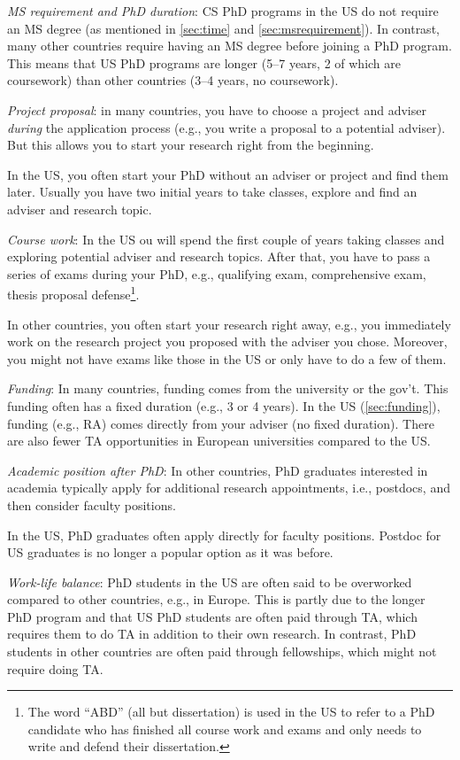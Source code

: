 \documentclass[oneside,11pt,dvipsnames]{book}
\begin{document}
\emph{MS requirement and PhD duration}:  CS PhD programs in the US do not require an MS degree (as mentioned in \autoref{sec:time} and \autoref{sec:msrequirement}).  In contrast, many other countries require having an MS degree before joining a PhD program.  This means that US PhD programs are longer (5--7 years, 2 of which are coursework) than other countries (3--4 years, no coursework).

\emph{Project proposal}: in many countries, you have to choose a project and adviser \emph{during} the application process (e.g., you write a proposal to a potential adviser). But this allows you to start your research right from the beginning. 

In the US, you often start your PhD without an adviser or project and find them later. Usually you have two initial years to take classes, explore and find an adviser and research topic. 

\emph{Course work}: In the US ou will spend the first couple of years taking classes and exploring potential adviser and research topics. 
After that, you have to pass a series of exams during your PhD, e.g., qualifying exam, comprehensive exam, thesis proposal defense\footnote{The word ``ABD'' (all but dissertation) is used in the US to refer to a PhD candidate who has finished all course work and exams and only needs to write and defend their dissertation.}.

In other countries, you often start your research right away, e.g., you immediately work on the research project you proposed with the adviser you chose. Moreover, you might not have exams like those in the US or only have to do a few of them.

\emph{Funding}:  In many countries, funding comes from the university or the gov't. This funding often has a fixed duration (e.g., 3 or 4 years).  In the US (\autoref{sec:funding}), funding (e.g., RA) comes directly from your adviser (no fixed duration).  There are also fewer TA opportunities in European universities compared to the US.

\emph{Academic position after PhD}: In other countries, PhD graduates interested in academia typically apply for additional research appointments, i.e., postdocs, and then consider faculty positions. 

In the US, PhD graduates often apply directly for faculty positions. Postdoc for US graduates is no longer a popular option as it was before.

\emph{Work-life balance}: PhD students in the US are often said to be overworked compared to other countries, e.g., in Europe.  This is partly due to the longer PhD program and that US PhD students are often paid through TA, which requires them to do TA in addition to their own research. In contrast, PhD students in other countries are often paid through fellowships, which might not require doing TA.
\end{document}
